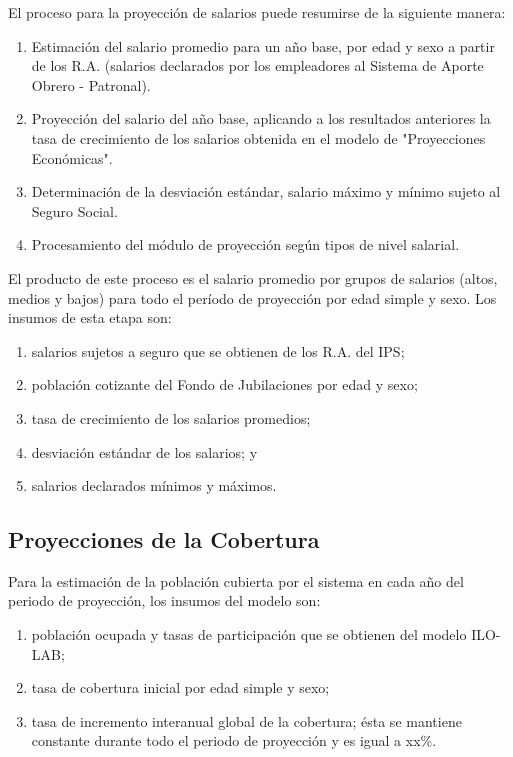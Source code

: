El proceso para la proyección de salarios puede resumirse de la
siguiente manera: \renewcommand{\theenumi}{\arabic{enumi}}

\begin{enumerate}
\item Estimación del salario promedio para un año base, por edad y sexo a partir de los R.A. (salarios declarados por los empleadores al Sistema de Aporte Obrero - Patronal).
\item Proyección del salario del año base, aplicando a los resultados anteriores la tasa de crecimiento de los salarios obtenida en el modelo de "Proyecciones Económicas".
\item Determinación de la desviación estándar, salario máximo y mínimo sujeto al Seguro Social.
\item Procesamiento del módulo de proyección según tipos de nivel salarial.
\end{enumerate}

El producto de este proceso es el salario promedio por grupos de
salarios (altos, medios y bajos) para todo el período de proyección por
edad simple y sexo. Los insumos de esta etapa son:
\renewcommand{\theenumi}{\roman{enumi}}

\begin{enumerate}
\item salarios sujetos a seguro que se obtienen de los R.A. del IPS;
\item población cotizante del Fondo de Jubilaciones por edad y sexo;
\item tasa de crecimiento de los salarios promedios;
\item desviación estándar de los salarios; y 
\item salarios declarados mínimos y máximos.
\end{enumerate}

\subsection{Proyecciones de la Cobertura}

Para la estimación de la población cubierta por el sistema en cada año
del periodo de proyección, los insumos del modelo son:

\begin{enumerate}
\item población ocupada y tasas de participación que se obtienen del modelo ILO-LAB;
\item tasa de cobertura inicial por edad simple y sexo;
\item tasa de incremento interanual global de la cobertura; ésta se mantiene constante durante todo el periodo de proyección y es igual a xx\%.
\end{enumerate}

